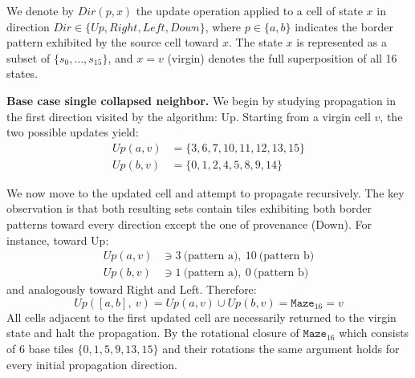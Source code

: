 We denote by $Dir(p, x)$ the update operation applied to a cell of state $x$
in direction $Dir \in \{Up, Right, Left, Down\}$, where $p \in \{a, b\}$
indicates the border pattern exhibited by the source cell toward $x$. The state
$x$ is represented as a subset of $\{s_0, \ldots, s_{15}\}$, and $x = v$
(virgin) denotes the full superposition of all 16 states.

\textbf{Base case single collapsed neighbor.}
We begin by studying propagation in the first direction visited by the algorithm:
Up. Starting from a virgin cell $v$, the two possible updates yield:
\begin{align*}
    Up(a, v) &= \{3, 6, 7, 10, 11, 12, 13, 15\} \\
    Up(b, v) &= \{0, 1, 2, 4, 5, 8, 9, 14\}
\end{align*}

We now move to the updated cell and attempt to propagate recursively. The key
observation is that both resulting sets contain tiles exhibiting both border
patterns toward every direction except the one of provenance (Down). For
instance, toward Up:
\begin{align*}
    Up(a, v) &\ni 3\ \text{(pattern a)},\ 10\ \text{(pattern b)} \\
    Up(b, v) &\ni 1\ \text{(pattern a)},\ 0\ \text{(pattern b)}
\end{align*}
and analogously toward Right and Left. Therefore:
\[
    Up([a,b],\ v) = Up(a, v) \cup Up(b, v) = \texttt{Maze}_{16} = v
\]
All cells adjacent to the first updated cell are necessarily returned to the
virgin state and halt the propagation. By the rotational closure of
$\texttt{Maze}_{16}$ which consists of 6 base tiles $\{0, 1, 5, 9, 13, 15\}$
and their rotations the same argument holds for every initial propagation
direction.


